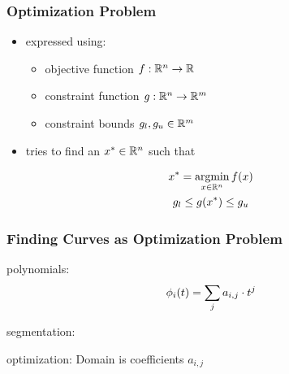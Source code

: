 \documentclass[mathserif]{beamer}
\begin{document}
		\begin{frame}
			\frametitle{Optimization Problem}
			\begin{itemize}
				\item expressed using:
				\begin{itemize}
					\item objective function \(f : \mathbb{R}^{n} \rightarrow \mathbb{R}\)
					\item constraint function \(g : \mathbb{R}^{n} \rightarrow \mathbb{R}^{m}\)
					\item constraint bounds \(g_l, g_u \in \mathbb{R}^{m}\)
				\end{itemize} 
				\item tries to find an \(x^* \in \mathbb{R}^{n}\) such that 
			\end{itemize}
			\begin{equation*}
				\begin{gathered}
					x^* = \operatorname*{argmin}_{x \in \mathbb{R}^{n}} f\!\left( x \right)\\
					g_l \leq g\!\left( x^* \right) \leq g_u
				\end{gathered}
			\end{equation*}
		\end{frame}

		\begin{frame}
			\frametitle{Finding Curves as Optimization Problem}

			polynomials:
			\begin{equation*}
				\phi_i\!\left( t \right) = \sum_j a_{i,j} \cdot t^j
			\end{equation*}

			segmentation:

			\bigskip

			optimization: Domain is coefficients \(a_{i,j}\)
		\end{frame}
\end{document}
